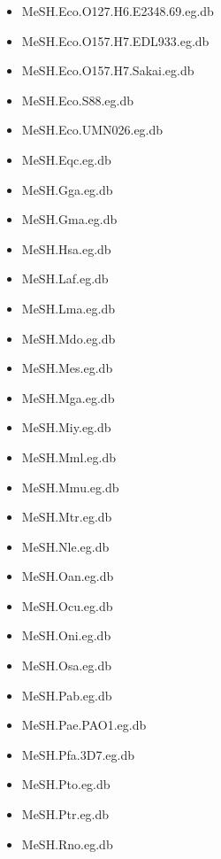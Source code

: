 \documentclass[margin,line,10pt]{res}
\newenvironment{list1}{
  \begin{list}{\ding{113}}{%
      \setlength{\itemsep}{0in}
      \setlength{\parsep}{0in} \setlength{\parskip}{0in}
      \setlength{\topsep}{0in} \setlength{\partopsep}{0in} 
      \setlength{\leftmargin}{0.17in}}}{\end{list}}
\begin{document}
\begin{resume}
\begin{list1}
\begin{multicols}{2}
\begin{itemize}
\item MeSH.Eco.O127.H6.E2348.69.eg.db
\item MeSH.Eco.O157.H7.EDL933.eg.db 
\item MeSH.Eco.O157.H7.Sakai.eg.db
\item MeSH.Eco.S88.eg.db
\item MeSH.Eco.UMN026.eg.db
\item MeSH.Eqc.eg.db 
\item MeSH.Gga.eg.db
\item MeSH.Gma.eg.db 
\item MeSH.Hsa.eg.db
\item MeSH.Laf.eg.db 
\item MeSH.Lma.eg.db 
\item MeSH.Mdo.eg.db 
\item MeSH.Mes.eg.db 
\item MeSH.Mga.eg.db 
\item MeSH.Miy.eg.db 
\item MeSH.Mml.eg.db 
\item MeSH.Mmu.eg.db 
\item MeSH.Mtr.eg.db 
\item MeSH.Nle.eg.db 
\item MeSH.Oan.eg.db 
\item MeSH.Ocu.eg.db 
\item MeSH.Oni.eg.db 
\item MeSH.Osa.eg.db 
\item MeSH.Pab.eg.db 
\item MeSH.Pae.PAO1.eg.db 
\item MeSH.Pfa.3D7.eg.db
\item MeSH.Pto.eg.db 
\item MeSH.Ptr.eg.db 
\item MeSH.Rno.eg.db  

\end{itemize}
\end{multicols}
\end{list1}
\end{resume}
\end{document}
